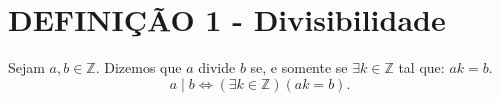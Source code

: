 \section*{DEFINIÇÃO 1 - Divisibilidade}
Sejam $a, b \in \mathbb{Z}$. Dizemos que $a$ divide $b$ se, e somente se $\exists k \in \mathbb{Z}$ tal que: $ak = b$.
\[
    a \mid b \iff (\exists k \in \mathbb{Z}) (ak = b).
\]